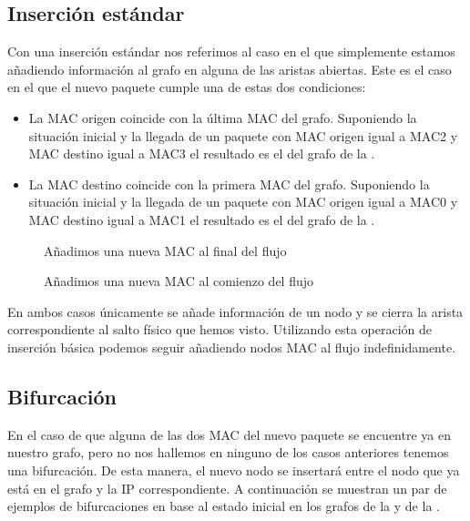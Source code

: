 \documentclass[twoside, 12pt]{epstfg}
\begin{document}
\subsection{Inserción estándar}
Con una inserción estándar nos referimos al caso en el que simplemente estamos añadiendo información al grafo en alguna de las aristas abiertas. Este es el caso en el que el nuevo paquete cumple una de estas dos condiciones:
\begin{itemize}
    \item La MAC origen coincide con la última MAC del grafo. Suponiendo la situación inicial y la llegada de un paquete con MAC origen igual a MAC2 y MAC destino igual a MAC3 el resultado es el del grafo de la .
    \item La MAC destino coincide con la primera MAC del grafo. Suponiendo la situación inicial y la llegada de un paquete con MAC origen igual a MAC0 y MAC destino igual a MAC1 el resultado es el del grafo de la .
\end{itemize}

\begin{figure}
\centering

\caption[Ejemplo inserción básica 1]{Añadimos una nueva MAC al final del flujo}
\label{fig:Analisis:AddingLast}
\end{figure}

\begin{figure}
\centering

\caption[Ejemplo inserción básica 2]{Añadimos una nueva MAC al comienzo del flujo}
\label{fig:Analisis:AddingFirst}
\end{figure}

En ambos casos únicamente se añade información de un nodo y se cierra la arista correspondiente al salto físico que hemos visto. Utilizando esta operación de inserción básica podemos seguir añadiendo nodos MAC al flujo indefinidamente.

\subsection{Bifurcación}
En el caso de que alguna de las dos MAC del nuevo paquete se encuentre ya en nuestro grafo, pero no nos hallemos en ninguno de los casos anteriores tenemos una bifurcación. De esta manera, el nuevo nodo se insertará entre el nodo que ya está en el grafo y la IP correspondiente. A continuación se muestran un par de ejemplos de bifurcaciones en base al estado inicial en los grafos de la  y de la .
\end{document}
